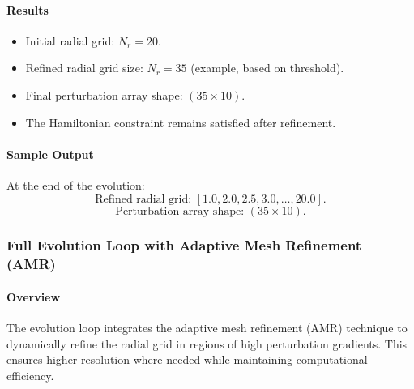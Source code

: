 \documentclass[12pt]{article}
\begin{document}
\paragraph{Results}
\begin{itemize}
    \item Initial radial grid: $N_r = 20$.
    \item Refined radial grid size: $N_r = 35$ (example, based on threshold).
    \item Final perturbation array shape: $(35 \times 10)$.
    \item The Hamiltonian constraint remains satisfied after refinement.
\end{itemize}

\paragraph{Sample Output}
At the end of the evolution:
\[
\text{Refined radial grid: } [1.0, 2.0, 2.5, 3.0, \dots, 20.0].
\]
\[
\text{Perturbation array shape: } (35 \times 10).
\]

\subsubsection{Full Evolution Loop with Adaptive Mesh Refinement (AMR)}

\paragraph{Overview}
The evolution loop integrates the adaptive mesh refinement (AMR) technique to dynamically refine the radial grid in regions of high perturbation gradients. This ensures higher resolution where needed while maintaining computational efficiency.
\end{document}
